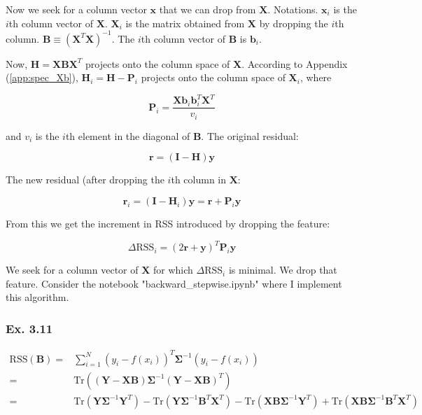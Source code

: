 \documentclass{article}
\begin{document}
Now we seek for a column vector $\mathbf{x}$ that we can drop from $\mathbf{X}$. Notations. $\mathbf{x}_i$ is the $i$th column vector of $\mathbf{X}$. $\mathbf{X}_i$ is the matrix obtained from $\mathbf{X}$ by dropping the $i$th column. $\mathbf{B} \equiv (\mathbf{X}^T\mathbf{X})^{-1}$. The $i$th column vector of $\mathbf{B}$ is $\mathbf{b}_i$.

Now, $\mathbf{H} = \mathbf{X}\mathbf{B}\mathbf{X}^T$ projects onto the column space of $\mathbf{X}$. According to Appendix (\ref{app:spec_Xb}), $\mathbf{H}_i = \mathbf{H} - \mathbf{P}_i$ projects onto the column space of $\mathbf{X}_i$, where

\[
\mathbf{P}_i = \frac{\mathbf{X}\mathbf{b}_i \mathbf{b}^T_i \mathbf{X}^T}{v_i}
\]

and $v_i$ is the $i$th element in the diagonal of $\mathbf{B}$. The original residual:

\[
\mathbf{r} = (\mathbf{I} - \mathbf{H})\mathbf{y}
\]

The new residual (after dropping the $i$th column in $\mathbf{X}$:

\[
\mathbf{r}_i = (\mathbf{I} - \mathbf{H}_i)\mathbf{y} = \mathbf{r} + \mathbf{P}_i \mathbf{y}
\]

From this we get the increment in RSS introduced by dropping the feature:

\[
\Delta \text{RSS}_i = (2\mathbf{r} + \mathbf{y})^T \mathbf{P}_i \mathbf{y}
\]

We seek for a column vector of $\mathbf{X}$ for which $\Delta\text{RSS}_i$ is minimal. We drop that feature. Consider the notebook "backward\_stepwise.ipynb" where I implement this algorithm.

\subsubsection{Ex. 3.11}

\[
\begin{split}
\text{RSS}(\mathbf{B}) =& \sum_{i=1}^{N} (y_i -f(x_i))^T \mathbf{\Sigma}^{-1} (y_i - f(x_i))\\
=& \text{Tr}\left( (\mathbf{Y} - \mathbf{X} \mathbf{B}) \mathbf{\Sigma}^{-1} (\mathbf{Y} - \mathbf{X} \mathbf{B})^T \right)\\
=&\text{Tr}(\mathbf{Y} \mathbf{\Sigma}^{-1} \mathbf{Y}^T) - \text{Tr}(\mathbf{Y} \mathbf{\Sigma}^{-1} \mathbf{B}^T \mathbf{X}^T) - \text{Tr}(\mathbf{X}\mathbf{B}\mathbf{\Sigma}^{-1}\mathbf{Y}^T) + \text{Tr}(\mathbf{X} \mathbf{B} \mathbf{\Sigma}^{-1} \mathbf{B}^T \mathbf{X}^T)
\end{split}
\]
\end{document}

